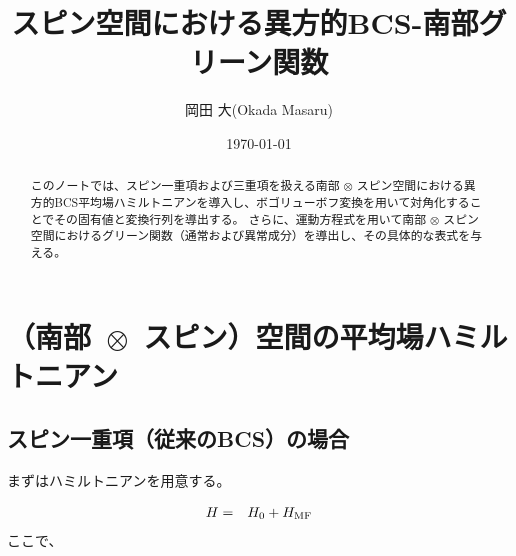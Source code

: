\documentclass[uplatex,a4j,12pt,dvipdfmx]{jsarticle}
\title{
スピン空間における異方的BCS-南部グリーン関数
}
\author{岡田 大(Okada Masaru)}
\date{\today}
\begin{document}
\maketitle

\begin{abstract}
	このノートでは、スピン一重項および三重項を扱える南部 $\otimes$ スピン空間における異方的BCS平均場ハミルトニアンを導入し、ボゴリューボフ変換を用いて対角化することでその固有値と変換行列を導出する。
	さらに、運動方程式を用いて南部 $\otimes$ スピン空間におけるグリーン関数（通常および異常成分）を導出し、その具体的な表式を与える。
\end{abstract}

\tableofcontents

\section{（南部 $\!\! \otimes \!\!$ スピン）空間の平均場ハミルトニアン}

\subsection{スピン一重項（従来のBCS）の場合}

まずはハミルトニアンを用意する。

\begin{eqnarray}
	H
	&=&
	H_{0}
	+
	H_{\rm MF}
\end{eqnarray}
%
ここで、
\end{document}
